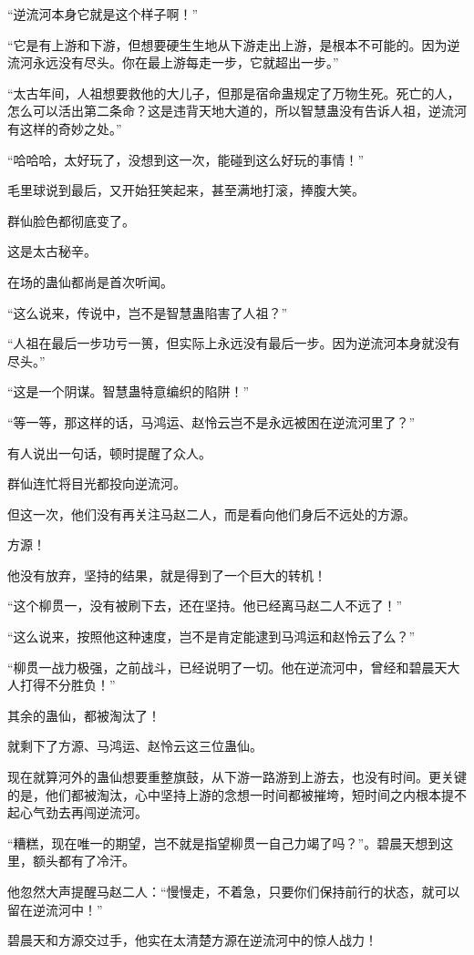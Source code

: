 \begin{this_body}
“逆流河本身它就是这个样子啊！”

“它是有上游和下游，但想要硬生生地从下游走出上游，是根本不可能的。因为逆流河永远没有尽头。你在最上游每走一步，它就超出一步。”

“太古年间，人祖想要救他的大儿子，但那是宿命蛊规定了万物生死。死亡的人，怎么可以活出第二条命？这是违背天地大道的，所以智慧蛊没有告诉人祖，逆流河有这样的奇妙之处。”

“哈哈哈，太好玩了，没想到这一次，能碰到这么好玩的事情！”

毛里球说到最后，又开始狂笑起来，甚至满地打滚，捧腹大笑。

群仙脸色都彻底变了。

这是太古秘辛。

在场的蛊仙都尚是首次听闻。

“这么说来，传说中，岂不是智慧蛊陷害了人祖？”

“人祖在最后一步功亏一篑，但实际上永远没有最后一步。因为逆流河本身就没有尽头。”

“这是一个阴谋。智慧蛊特意编织的陷阱！”

“等一等，那这样的话，马鸿运、赵怜云岂不是永远被困在逆流河里了？”

有人说出一句话，顿时提醒了众人。

群仙连忙将目光都投向逆流河。

但这一次，他们没有再关注马赵二人，而是看向他们身后不远处的方源。

方源！

他没有放弃，坚持的结果，就是得到了一个巨大的转机！

“这个柳贯一，没有被刷下去，还在坚持。他已经离马赵二人不远了！”

“这么说来，按照他这种速度，岂不是肯定能逮到马鸿运和赵怜云了么？”

“柳贯一战力极强，之前战斗，已经说明了一切。他在逆流河中，曾经和碧晨天大人打得不分胜负！”

其余的蛊仙，都被淘汰了！

就剩下了方源、马鸿运、赵怜云这三位蛊仙。

现在就算河外的蛊仙想要重整旗鼓，从下游一路游到上游去，也没有时间。更关键的是，他们都被淘汰，心中坚持上游的念想一时间都被摧垮，短时间之内根本提不起心气劲去再闯逆流河。

“糟糕，现在唯一的期望，岂不就是指望柳贯一自己力竭了吗？”。碧晨天想到这里，额头都有了冷汗。

他忽然大声提醒马赵二人：“慢慢走，不着急，只要你们保持前行的状态，就可以留在逆流河中！”

碧晨天和方源交过手，他实在太清楚方源在逆流河中的惊人战力！


\end{this_body}
